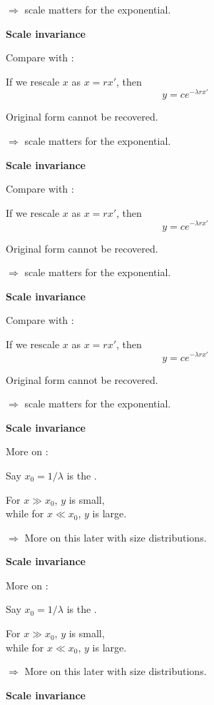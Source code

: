 $\Rightarrow$ scale matters for the exponential.


  \textbf{Scale invariance}

Compare with :

If we rescale $x$ as $x = rx'$, then
$$ y = c e^{-\lambda rx'} $$

\inv
Original form cannot be recovered.

$\Rightarrow$ scale matters for the exponential.


  \textbf{Scale invariance}

Compare with :

If we rescale $x$ as $x = rx'$, then
$$ y = c e^{-\lambda rx'} $$

Original form cannot be recovered.

\inv

$\Rightarrow$ scale matters for the exponential.


  \textbf{Scale invariance}

Compare with :

If we rescale $x$ as $x = rx'$, then
$$ y = c e^{-\lambda rx'} $$

Original form cannot be recovered.

$\Rightarrow$ scale matters for the exponential.


  \textbf{Scale invariance}

More on :

\inv

Say $x_0 = 1/\lambda$ is the .

For $x \gg x_0$, $y$ is small,\\
while for $x \ll x_0$, $y$ is large.

$\Rightarrow$ More on this later with size distributions.


  \textbf{Scale invariance}

More on :

Say $x_0 = 1/\lambda$ is the .

\inv 

For $x \gg x_0$, $y$ is small,\\
while for $x \ll x_0$, $y$ is large.

$\Rightarrow$ More on this later with size distributions.


  \textbf{Scale invariance}

